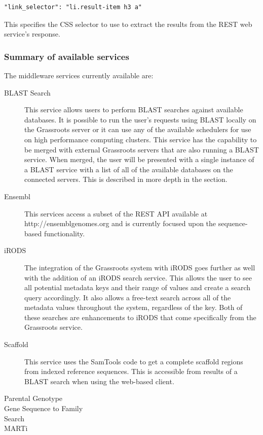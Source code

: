 \documentclass[12pt,a4paper]{extarticle}
\begin{document}
\begin{lstlisting}[style=json]
"link_selector": "li.result-item h3 a"
\end{lstlisting}
This specifies the CSS selector to use to extract the results from the REST web service's response.

\subsubsection*{Summary of available services}

The middleware services currently available are:

\begin{description}

\item [BLAST Search] This service allows users to perform BLAST searches against available databases.
It is possible to run the user's requests using BLAST locally on the Grassroots server or it can use any of the available schedulers for use on high performance computing clusters. 
This service has the capability to be merged with external Grassroots servers that are
also running a BLAST service. 
When merged, the user will be presented with a single instance of a BLAST service with a list of all of the available databases on the connected servers. 
This is described in more depth in the  section. 


\item [Ensembl] This services access a subset of the REST API available at http://ensemblgenomes.org\cite{kersey2016ensembl} and is currently focused upon the sequence-based functionality.

\item [iRODS] The integration of the Grassroots system with iRODS goes further as well with the addition of an iRODS search service. 
This allows the user to see all potential metadata keys and their range of values and create a search query accordingly.
It also allows a free-text search across all of the metadata values throughout the system, regardless of the key. 
Both of these searches are enhancements to iRODS that come specifically from the Grassroots service.

\item [Scaffold] This service uses the SamTools\cite{li2009sequence} code to get a complete scaffold regions from indexed reference sequences. 
This is accessible from results of a BLAST search when using the web-based client.

\item [Parental Genotype] 

\item [Gene Sequence to Family] 

\item [Search]

\item [MARTi]


\end{description}
\end{document}
